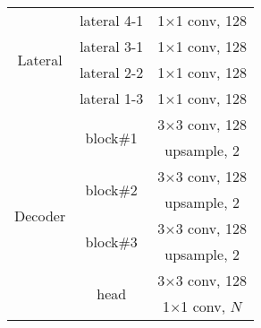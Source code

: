 \documentclass[journal]{IEEEtran}
\begin{document}
\begin{table}[htb]
\begin{tabular}{ccc}
    \multicolumn{1}{c|}{\multirow{4}{*}{Lateral}}  & \multicolumn{1}{c|}{lateral 4-1}               & 1$\times$1 conv, 128           \\ \cline{2-3}
    \multicolumn{1}{c|}{}                          & \multicolumn{1}{c|}{lateral 3-1}               & 1$\times$1 conv, 128           \\ \cline{2-3}
    \multicolumn{1}{c|}{}                          & \multicolumn{1}{c|}{lateral 2-2}               & 1$\times$1 conv, 128           \\ \cline{2-3}
    \multicolumn{1}{c|}{}                          & \multicolumn{1}{c|}{lateral 1-3}               & 1$\times$1 conv, 128           \\ \hline
    \multicolumn{1}{c|}{\multirow{8}{*}{Decoder}}  & \multicolumn{1}{c|}{\multirow{2}{*}{block\#1}} & 3$\times$3 conv, 128           \\
    \multicolumn{1}{c|}{}                          & \multicolumn{1}{c|}{}                          & upsample, 2                    \\ \cline{2-3}
    \multicolumn{1}{c|}{}                          & \multicolumn{1}{c|}{\multirow{2}{*}{block\#2}} & 3$\times$3 conv, 128           \\
    \multicolumn{1}{c|}{}                          & \multicolumn{1}{c|}{}                          & upsample, 2                    \\ \cline{2-3}
    \multicolumn{1}{c|}{}                          & \multicolumn{1}{c|}{\multirow{2}{*}{block\#3}} & 3$\times$3 conv, 128           \\
    \multicolumn{1}{c|}{}                          & \multicolumn{1}{c|}{}                          & upsample, 2                    \\ \cline{2-3}
    \multicolumn{1}{c|}{}                          & \multicolumn{1}{c|}{\multirow{2}{*}{head}}     & 3$\times$3 conv, 128           \\
    \multicolumn{1}{c|}{}                          & \multicolumn{1}{c|}{}                          & 1$\times$1 conv, $N$           \\ \hline
  \end{tabular}
\end{table}
\end{document}
